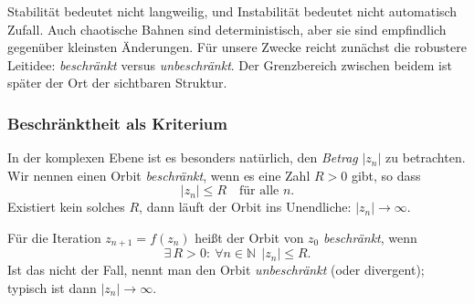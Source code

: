 \begin{figure}[h]
	\centering
	
	\hfill
\end{figure}

\begin{DidacticBox}
	\label{box:stabil}
	Stabilität bedeutet nicht \glqq langweilig\grqq{},
	und Instabilität bedeutet nicht automatisch \glqq Zufall\grqq.
	Auch chaotische Bahnen sind deterministisch,
	aber sie sind empfindlich gegenüber kleinsten Änderungen.
	Für unsere Zwecke reicht zunächst die robustere Leitidee:
	\emph{beschränkt} versus \emph{unbeschränkt}.
	Der Grenzbereich zwischen beidem ist später der Ort der sichtbaren Struktur.
\end{DidacticBox}

\subsubsection*{Beschränktheit als Kriterium}

In der komplexen Ebene ist es besonders natürlich, den \emph{Betrag} $|z_n|$ zu betrachten.
Wir nennen einen Orbit \emph{beschränkt}, wenn es eine Zahl $R>0$ gibt, so dass
\[
|z_n|\le R \quad \text{für alle } n.
\]
Existiert kein solches $R$, dann läuft der Orbit ins Unendliche:
$|z_n|\to\infty$.

\begin{MathBox}
	\label{box:beschraenkt}
	Für die Iteration $z_{n+1}=f(z_n)$ heißt der Orbit von $z_0$ \emph{beschränkt}, wenn
	\[
	\exists\, R>0:\ \forall n\in\mathbb{N}\ \ |z_n|\le R.
	\]
	Ist das nicht der Fall, nennt man den Orbit \emph{unbeschränkt} (oder divergent);
	typisch ist dann $|z_n|\to\infty$.
\end{MathBox}


